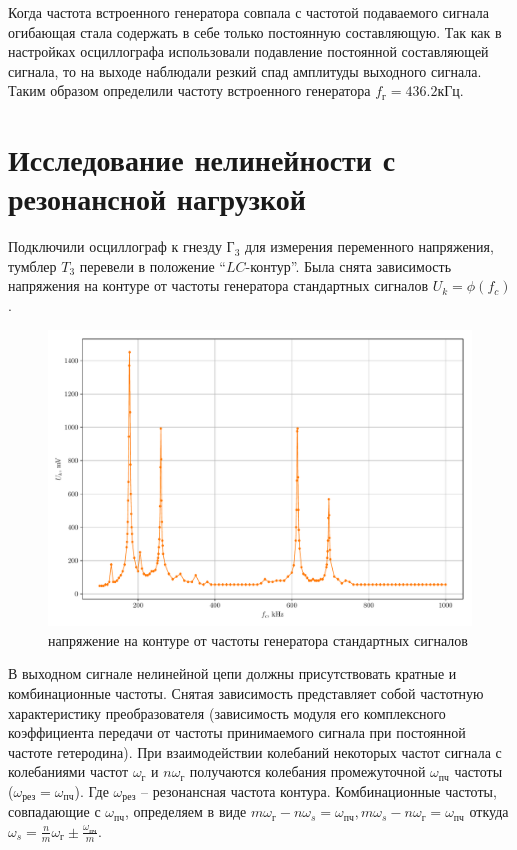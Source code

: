 Когда частота встроенного генератора совпала с частотой подаваемого сигнала огибающая стала содержать в себе только постоянную составляющую. Так как в настройках осциллографа использовали подавление постоянной составляющей сигнала, то на выходе наблюдали резкий спад амплитуды выходного сигнала. Таким образом определили частоту встроенного генератора $f_\text{г}=436.2\text{кГц}$.
\section[Задание 2]{Исследование нелинейности с резонансной нагрузкой}
Подключили осциллограф к гнезду $Г_3$ для измерения переменного напряжения,
тумблер $T_3$ перевели в положение “$LC$-контур”.
Была снята зависимость напряжения на контуре от частоты генератора стандартных сигналов $U_k=\phi(f_c)$.
\begin{figure}[h!]
	\centering
	\includegraphics[width=\textwidth]{plots/exp2.pdf}
	\caption{напряжение на контуре от частоты генератора стандартных сигналов}
	\label{exp:2}
\end{figure}

В выходном сигнале нелинейной цепи должны присутствовать кратные и комбинационные частоты. Снятая зависимость представляет собой частотную характеристику преобразователя (зависимость модуля его комплексного коэффициента передачи от частоты принимаемого сигнала при постоянной частоте гетеродина). При взаимодействии колебаний некоторых
частот сигнала с колебаниями частот $\omega_{\text{г}}$ и $n\omega_{\text{г}}$ получаются колебания промежуточной
$\omega_{\text{пч}}$ частоты ($\omega_{\text{рез}} = \omega_{\text{пч}}$). Где $\omega_{\text{рез}}$ -- резонансная частота контура. Комбинационные частоты, совпадающие с $\omega_{\text{пч}}$, определяем в
виде $m\omega_{\text{г}} - n\omega_s = \omega_{\text{пч}}, m\omega_s - n\omega_{\text{г}} = \omega_{\text{пч}}$ откуда $\omega_s =\frac{n}{m}\omega_{\text{г}}\pm\frac{\omega_{\text{пч}}}{m}$.

